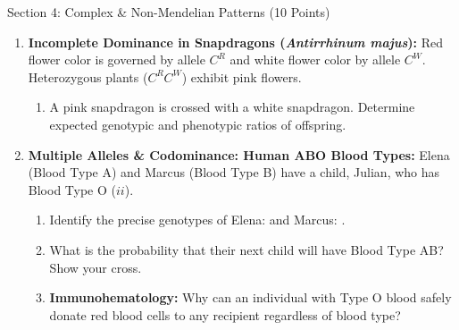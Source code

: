 \documentclass[10pt,a4paper]{scrartcl}
\begin{document}
\begin{sectionbox}{Section 4: Complex \& Non-Mendelian Patterns (10 Points)}
\begin{enumerate}
  \item \textbf{Incomplete Dominance in Snapdragons (\textit{Antirrhinum majus}):}
  Red flower color is governed by allele $C^R$ and white flower color by allele $C^W$. Heterozygous plants ($C^R C^W$) exhibit pink flowers.
  \begin{enumerate}
    \item A pink snapdragon is crossed with a white snapdragon. Determine expected genotypic and phenotypic ratios of offspring.
  \end{enumerate}

  \vspace{1pt}
  \begin{workspace}
    \vspace{0.8cm}
  \end{workspace}

  \vspace{2pt}
  \item \textbf{Multiple Alleles \& Codominance: Human ABO Blood Types:}
  Elena (Blood Type A) and Marcus (Blood Type B) have a child, Julian, who has Blood Type O ($ii$).
  \begin{enumerate}
    \item Identify the precise genotypes of Elena: \underline{\hspace{1.8cm}} and Marcus: \underline{\hspace{1.8cm}}.
    \item What is the probability that their next child will have Blood Type AB? Show your cross.
    \item \textbf{Immunohematology:} Why can an individual with Type O blood safely donate red blood cells to any recipient regardless of blood type?
  \end{enumerate}
\end{enumerate}
\end{sectionbox}

\newpage
\end{document}
